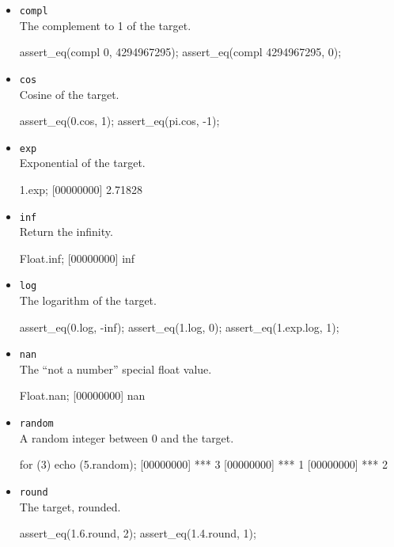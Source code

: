 \begin{itemize}
\item \lstinline|compl|\\
  The complement to 1 of the target.
\begin{urbiscript}
assert_eq(compl 0, 4294967295);
assert_eq(compl 4294967295, 0);
\end{urbiscript}

\item \lstinline|cos|\\
  Cosine of the target.
\begin{urbiscript}
assert_eq(0.cos, 1);
assert_eq(pi.cos, -1);
\end{urbiscript}

\item \lstinline|exp|\\
  Exponential of the target.
\begin{urbiscript}
1.exp;
[00000000] 2.71828
\end{urbiscript}

\item \lstinline|inf|\\
  Return the infinity.
\begin{urbiscript}
Float.inf;
[00000000] inf
\end{urbiscript}

\item \lstinline|log|\\
  The logarithm of the target.
\begin{urbiscript}
assert_eq(0.log, -inf);
assert_eq(1.log, 0);
assert_eq(1.exp.log, 1);
\end{urbiscript}

\item \lstinline|nan|\\
  The ``not a number'' special float value.
\begin{urbiscript}
Float.nan;
[00000000] nan
\end{urbiscript}

\item \lstinline|random|\\
  A random integer between 0 and the target.
\begin{urbiscript}
for (3)
  echo (5.random);
[00000000] *** 3
[00000000] *** 1
[00000000] *** 2
\end{urbiscript}

\item \lstinline|round|\\
  The target, rounded.
\begin{urbiscript}
assert_eq(1.6.round, 2);
assert_eq(1.4.round, 1);
\end{urbiscript}


\end{itemize}
